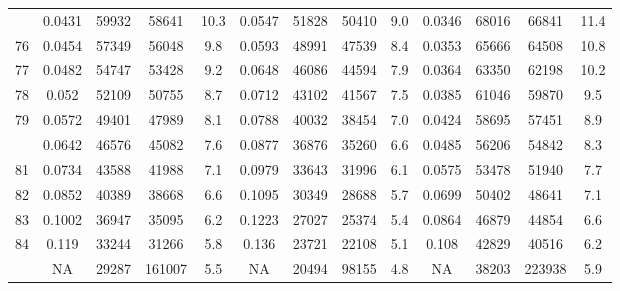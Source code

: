 \documentclass[
  14pt,
]{article}
\begin{document}
\begin{longtable}[t]{lcccccccccccc}
\addlinespace
75 & 0.0431 & 59932 & 58641 & 10.3 & 0.0547 & 51828 & 50410 & 9.0 & 0.0346 & 68016 & 66841 & 11.4\\
76 & 0.0454 & 57349 & 56048 & 9.8 & 0.0593 & 48991 & 47539 & 8.4 & 0.0353 & 65666 & 64508 & 10.8\\
77 & 0.0482 & 54747 & 53428 & 9.2 & 0.0648 & 46086 & 44594 & 7.9 & 0.0364 & 63350 & 62198 & 10.2\\
78 & 0.052 & 52109 & 50755 & 8.7 & 0.0712 & 43102 & 41567 & 7.5 & 0.0385 & 61046 & 59870 & 9.5\\
79 & 0.0572 & 49401 & 47989 & 8.1 & 0.0788 & 40032 & 38454 & 7.0 & 0.0424 & 58695 & 57451 & 8.9\\
\addlinespace
80 & 0.0642 & 46576 & 45082 & 7.6 & 0.0877 & 36876 & 35260 & 6.6 & 0.0485 & 56206 & 54842 & 8.3\\
81 & 0.0734 & 43588 & 41988 & 7.1 & 0.0979 & 33643 & 31996 & 6.1 & 0.0575 & 53478 & 51940 & 7.7\\
82 & 0.0852 & 40389 & 38668 & 6.6 & 0.1095 & 30349 & 28688 & 5.7 & 0.0699 & 50402 & 48641 & 7.1\\
83 & 0.1002 & 36947 & 35095 & 6.2 & 0.1223 & 27027 & 25374 & 5.4 & 0.0864 & 46879 & 44854 & 6.6\\
84 & 0.119 & 33244 & 31266 & 5.8 & 0.136 & 23721 & 22108 & 5.1 & 0.108 & 42829 & 40516 & 6.2\\
\addlinespace
85 & NA & 29287 & 161007 & 5.5 & NA & 20494 & 98155 & 4.8 & NA & 38203 & 223938 & 5.9\\*
\end{longtable}
\end{document}
